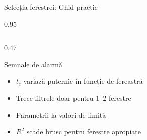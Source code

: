 \documentclass[9pt, aspectratio=169, t]{beamer}
\begin{document}
\begin{frame}{Selecția ferestrei: Ghid practic}
\begin{cminipage}{0.95\textwidth}
{\begin{columns}[T]
\begin{column}{0.47\textwidth}
            \begin{block}{Semnale de alarmă}
                \begin{itemize}\setlength{\itemsep}{0pt}
                    \item $t_c$ variază puternic în funcție de fereastră
                    \item Trece filtrele doar pentru 1--2 ferestre
                    \item Parametrii la valori de limită
                    \item $R^2$ scade brusc pentru ferestre apropiate
                \end{itemize}
            \end{block}
        \end{column}
    \end{columns}
    }
    \end{cminipage}
\end{frame}
\end{document}
